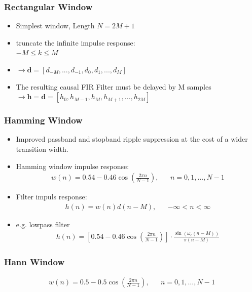 \subsubsection{Rectangular Window}
\begin{multicols}{2}
	\begin{itemize}
		\item Simplest window, Length $N = 2M+1$
		\item truncate the infinite impulse response: \\ $-M \leq k \leq M$
		\item $\rightarrow \mathbf{d} = [d_{-M}, ..., d_{-1}, d_0, d_1, ..., d_M]$
		\item The resulting causal FIR Filter must be delayed by M samples \newline
		$\rightarrow \mathbf{h} = \mathbf{d} = [h_0, h_{M-1}, h_M, h_{M+1}, ..., h_{2M}]$
	\end{itemize}

	\begin{center}
		
	\end{center}
\end{multicols}

\subsubsection{Hamming Window}
\begin{itemize}
	\item Improved passband and stopband ripple suppression at the cost of a wider transition width.
	\item Hamming window impulse response:
	\begin{align*}
		w(n) = 0.54 -0.46\cos\left(\frac{2\pi n}{N-1}\right),&&n= 0,1,\dots,N-1
	\end{align*}
	\item Filter impuls response:
	\begin{align*}
		h(n) = w(n)d(n-M),&&-\infty < n < \infty
	\end{align*}
	\item e.g. lowpass filter
	\begin{align*}
		h(n) = \left[0.54 -0.46\cos\left(\frac{2\pi n}{N-1}\right)\right]\cdot\frac{\sin(\omega_c(n-M))}{\pi (n-M)}
	\end{align*}
\end{itemize}

\subsubsection{Hann Window}
\begin{align*}
  w(n) = 0.5 - 0.5\cos\left(\frac{2\pi n}{N-1}\right),&&n= 0,1,\ldots,N-1
\end{align*}


